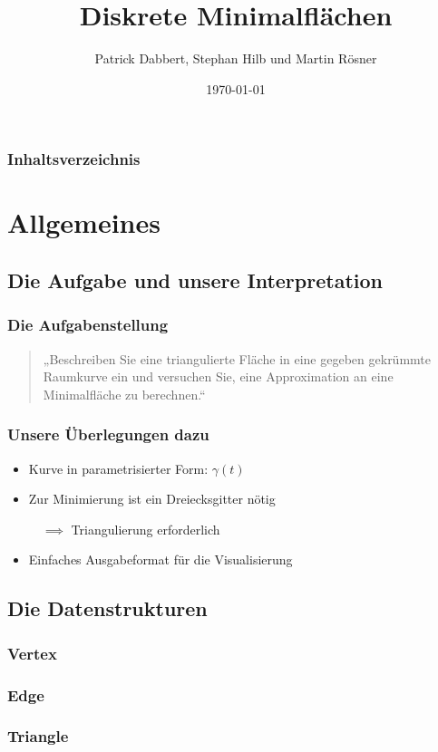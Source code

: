 \documentclass{beamer}
\title{Diskrete Minimalflächen}
\author{Patrick Dabbert, Stephan Hilb und Martin Rösner}
\date{\today}
\begin{document}
\begin{frame}
	\titlepage
\end{frame}

\begin{frame}
	\frametitle{Inhaltsverzeichnis}
	\tableofcontents
\end{frame}

\section{Allgemeines}

\subsection{Die Aufgabe und unsere Interpretation}

\begin{frame}
	\frametitle{Die Aufgabenstellung}
	\begin{quote}
		„Beschreiben Sie eine triangulierte Fläche in eine gegeben gekrümmte Raumkurve ein und versuchen Sie, eine Approximation an eine Minimalfläche zu berechnen.“
	\end{quote}
\end{frame}

\begin{frame}
	\frametitle{Unsere Überlegungen dazu}
	\begin{itemize}
		\item
			Kurve in parametrisierter Form: $\gamma(t)$
		\item
			Zur Minimierung ist ein Dreiecksgitter nötig
			
			$\quad \implies$ Triangulierung erforderlich
		\item
			Einfaches Ausgabeformat für die Visualisierung
	\end{itemize}
\end{frame}

\subsection{Die Datenstrukturen}

\begin{frame}
	\frametitle{Vertex}
	
\end{frame}

\begin{frame}
	\frametitle{Edge}
	
\end{frame}

\begin{frame}
	\frametitle{Triangle}
	
\end{frame}
\end{document}
